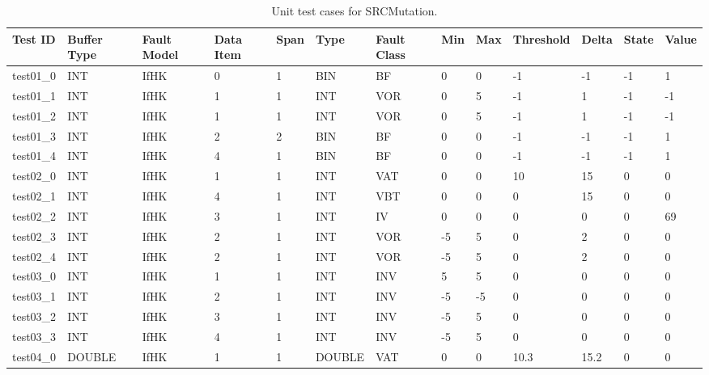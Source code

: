 
\setlength\LTleft{0pt}
\setlength\LTright{0pt}
\scriptsize

\begin{longtable}{|l|l|l|p{0.5cm}|p{0.5cm}|l|p{0.5cm}|p{0.5cm}|p{0.5cm}|l|l|p{0.5cm}|l|}

\caption{Unit test cases for SRCMutation.}
\label{table:matrix_DAMA} \\

\hline
\textbf{Test ID} & \textbf{Buffer Type} & \textbf{Fault Model} & \textbf{Data Item} & \textbf{Span} & \textbf{Type} & \textbf{Fault Class} & \textbf{Min} & \textbf{Max} & \textbf{Threshold} & \textbf{Delta} & \textbf{State} & \textbf{Value}\\
\hline
test01\_0 & INT & IfHK & 0 & 1 & BIN & BF & 0 & 0 & -1 & -1 & -1 & 1 \\
test01\_1 & INT & IfHK & 1 & 1 & INT & VOR & 0 & 5 & -1 & 1 & -1 & -1 \\
test01\_2 & INT & IfHK & 1 & 1 & INT & VOR & 0 & 5 & -1 & 1 & -1 & -1 \\
test01\_3 & INT & IfHK & 2 & 2 & BIN & BF & 0 & 0 & -1 & -1 & -1 & 1 \\
test01\_4 & INT & IfHK & 4 & 1 & BIN & BF & 0 & 0 & -1 & -1 & -1 & 1 \\
test02\_0 & INT & IfHK & 1 & 1 & INT & VAT & 0 & 0 & 10 & 15 & 0 & 0 \\
test02\_1 & INT & IfHK & 4 & 1 & INT & VBT & 0 & 0 & 0 & 15 & 0 & 0 \\
test02\_2 & INT & IfHK & 3 & 1 & INT & IV & 0 & 0 & 0 & 0 & 0 & 69 \\
test02\_3 & INT & IfHK & 2 & 1 & INT & VOR & -5 & 5 & 0 & 2 & 0 & 0 \\
test02\_4 & INT & IfHK & 2 & 1 & INT & VOR & -5 & 5 & 0 & 2 & 0 & 0 \\
test03\_0 & INT & IfHK & 1 & 1 & INT & INV & 5 & 5 & 0 & 0 & 0 & 0 \\
test03\_1 & INT & IfHK & 2 & 1 & INT & INV & -5 & -5 & 0 & 0 & 0 & 0 \\
test03\_2 & INT & IfHK & 3 & 1 & INT & INV & -5 & 5 & 0 & 0 & 0 & 0 \\
test03\_3 & INT & IfHK & 4 & 1 & INT & INV & -5 & 5 & 0 & 0 & 0 & 0 \\
test04\_0 & DOUBLE & IfHK & 1 & 1 & DOUBLE & VAT & 0 & 0 & 10.3 & 15.2 & 0 & 0 \\

\end{longtable}
